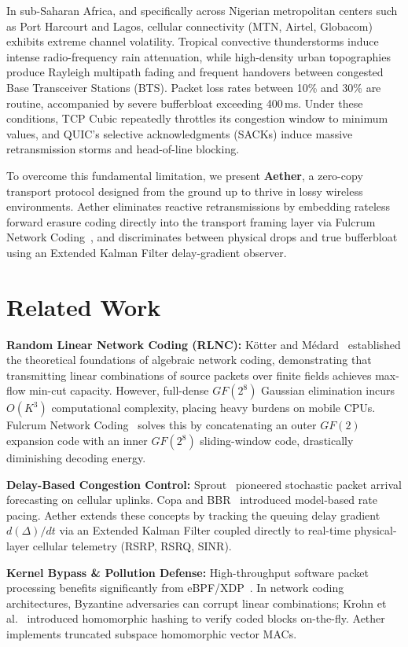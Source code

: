 \documentclass[10pt,twocolumn]{article}
\begin{document}
In sub-Saharan Africa, and specifically across Nigerian metropolitan centers such as Port Harcourt and Lagos, cellular connectivity (MTN, Airtel, Globacom) exhibits extreme channel volatility. Tropical convective thunderstorms induce intense radio-frequency rain attenuation, while high-density urban topographies produce Rayleigh multipath fading and frequent handovers between congested Base Transceiver Stations (BTS). Packet loss rates between 10\% and 30\% are routine, accompanied by severe bufferbloat exceeding 400\,ms. Under these conditions, TCP Cubic repeatedly throttles its congestion window to minimum values, and QUIC's selective acknowledgments (SACKs) induce massive retransmission storms and head-of-line blocking.

To overcome this fundamental limitation, we present \textbf{Aether}, a zero-copy transport protocol designed from the ground up to thrive in lossy wireless environments. Aether eliminates reactive retransmissions by embedding rateless forward erasure coding directly into the transport framing layer via Fulcrum Network Coding~\cite{lucani2018fulcrum}, and discriminates between physical drops and true bufferbloat using an Extended Kalman Filter delay-gradient observer.

\section{Related Work}
\textbf{Random Linear Network Coding (RLNC):} K{\"o}tter and M{\'e}dard~\cite{medard2000network} established the theoretical foundations of algebraic network coding, demonstrating that transmitting linear combinations of source packets over finite fields achieves max-flow min-cut capacity. However, full-dense $GF(2^8)$ Gaussian elimination incurs $O(K^3)$ computational complexity, placing heavy burdens on mobile CPUs. Fulcrum Network Coding~\cite{lucani2018fulcrum} solves this by concatenating an outer $GF(2)$ expansion code with an inner $GF(2^8)$ sliding-window code, drastically diminishing decoding energy.

\textbf{Delay-Based Congestion Control:} Sprout~\cite{winstein2013sprout} pioneered stochastic packet arrival forecasting on cellular uplinks. Copa and BBR~\cite{cardwell2016bbr} introduced model-based rate pacing. Aether extends these concepts by tracking the queuing delay gradient $d(\Delta)/dt$ via an Extended Kalman Filter coupled directly to real-time physical-layer cellular telemetry (RSRP, RSRQ, SINR).

\textbf{Kernel Bypass \& Pollution Defense:} High-throughput software packet processing benefits significantly from eBPF/XDP~\cite{hoppe2019xdp}. In network coding architectures, Byzantine adversaries can corrupt linear combinations; Krohn et al.~\cite{krohn2004pollution} introduced homomorphic hashing to verify coded blocks on-the-fly. Aether implements truncated subspace homomorphic vector MACs.
\end{document}

